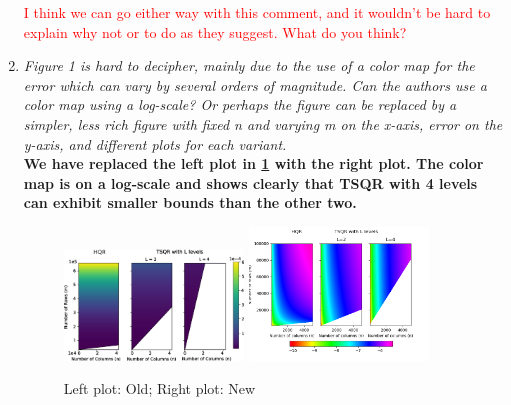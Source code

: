 \documentclass[final,onefignum,onetabnum]{siamart190516}
\newcommand{\red}[1]{\textcolor{red}{#1}}
\begin{document}
\begin{enumerate}
    \red{I think we can go either way with this comment, and it wouldn't be hard to explain why not or to do as they suggest. What do you think?}
    \item {\it Figure 1 is hard to decipher, mainly due to the use of a color map for the error which can vary by several orders of magnitude. Can the authors use a color map using a log-scale? Or perhaps the figure can be replaced by a simpler, less rich figure with fixed n and varying m on the x-axis, error on the y-axis, and different plots for each variant.}\\
    {\bf We have replaced the left plot in \cref{fig:Fig1} with the right plot. The color map is on a log-scale and shows clearly that TSQR with 4 levels can exhibit smaller bounds than the other two. }
\begin{figure}[h!]
    \centering
    \vspace{-10pt}
    \includegraphics[width=0.45\textwidth]{./figures/paramspace.png}
    \includegraphics[width=0.45\textwidth]{./paramspace2.png}
    \caption{\label{fig:Fig1}Left plot: Old; Right plot: New}
    \vspace{-10pt}
\end{figure} 


\end{enumerate}
\end{document}
